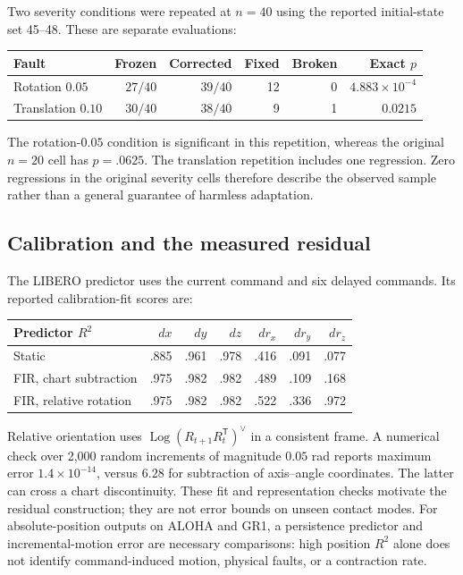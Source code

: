 Two severity conditions were repeated at $n=40$ using the reported initial-state set
45--48. These are separate evaluations:
\begin{center}\small
\begin{tabular}{lrrrrr}
\toprule
Fault & Frozen & Corrected & Fixed & Broken & Exact $p$\\
\midrule
Rotation $0.05$ & $27/40$ & $39/40$ & 12 & 0 & $4.883\times10^{-4}$\\
Translation $0.10$ & $30/40$ & $38/40$ & 9 & 1 & $0.0215$\\
\bottomrule
\end{tabular}
\end{center}
The rotation-$0.05$ condition is significant in this repetition, whereas the original
$n=20$ cell has $p=.0625$. The translation repetition includes one regression.
Zero regressions in the original severity cells therefore describe the observed
sample rather than a general guarantee of harmless adaptation.

\subsection{Calibration and the measured residual}
\label{app:calibration}

The LIBERO predictor uses the current command and six delayed commands. Its reported
calibration-fit scores are:
\begin{center}\small
\begin{tabular}{lrrrrrr}
\toprule
Predictor $R^2$ & $dx$ & $dy$ & $dz$ & $dr_x$ & $dr_y$ & $dr_z$\\
\midrule
Static & .885 & .961 & .978 & .416 & .091 & .077\\
FIR, chart subtraction & .975 & .982 & .982 & .489 & .109 & .168\\
FIR, relative rotation & .975 & .982 & .982 & .522 & .336 & .972\\
\bottomrule
\end{tabular}
\end{center}
Relative orientation uses $\operatorname{Log}(R_{t+1}R_t^{\mathsf T})^\vee$ in a
consistent frame. A numerical check over 2,000 random increments of magnitude
$0.05$ rad reports maximum error $1.4\times10^{-14}$, versus $6.28$ for subtraction
of axis--angle coordinates. The latter can cross a chart discontinuity. These fit
and representation checks motivate the residual construction; they are not error
bounds on unseen contact modes. For absolute-position outputs on ALOHA and
GR1, a persistence predictor and incremental-motion error are necessary
comparisons: high position $R^2$ alone does not identify command-induced
motion, physical faults, or a contraction rate.

